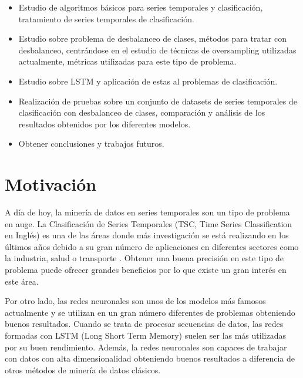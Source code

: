 \begin{itemize}
	\item Estudio de algoritmos básicos para series temporales y clasificación, tratamiento de series temporales de clasificación.
	\item Estudio sobre problema de desbalanceo de clases, métodos para tratar con desbalanceo, centrándose en el estudio de técnicas de oversampling utilizadas actualmente, métricas utilizadas para este tipo de problema.
	\item Estudio sobre LSTM y aplicación de estas al problemas de clasificación.
	\item Realización de pruebas sobre un conjunto de datasets de series temporales de clasificación con desbalanceo de clases, comparación y análisis de los resultados obtenidos por los diferentes modelos.
	\item Obtener conclusiones y trabajos futuros.
\end{itemize}
\section{Motivación}
A día de hoy, la minería de datos en series temporales son un tipo de problema en auge. La Clasificación de Series Temporales (TSC, Time Series Classification en Inglés) es una de las áreas donde más investigación se está realizando en los últimos años debido a su gran número de aplicaciones en diferentes sectores como la industria, salud o transporte \cite{cao2013integrated} \cite{cao2014parsimonious} \cite{he2017uncertainty} \cite{xu2018spatio} \cite{roychoudhury2017cost} \cite{liang2013effective} \cite{geng2018cost}. Obtener una buena precisión en este tipo de problema puede ofrecer grandes beneficios por lo que existe un gran interés en este área.\newline

Por otro lado, las redes neuronales son unos de los modelos más famosos actualmente \cite{chung2015gated} \cite{cho2014properties} \cite{karim2017lstm} \cite{swapna2018automated} y se utilizan en un gran número diferentes de problemas obteniendo buenos resultados. Cuando se trata de procesar secuencias de datos, las redes formadas con LSTM (Long Short Term Memory) suelen ser las más utilizadas por su buen rendimiento.  Además, la redes neuronales son capaces de trabajar con datos con alta dimensionalidad obteniendo buenos resultados a diferencia de otros métodos de minería de datos clásicos. \newline


